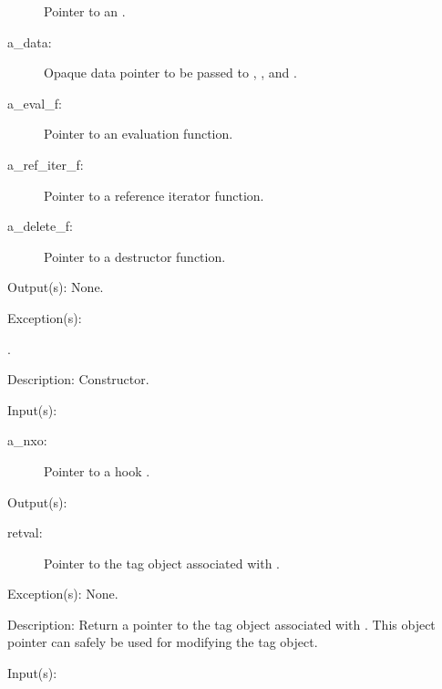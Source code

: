 \begin{capi}
\begin{capilist}
\begin{description}
			Pointer to an .
		\item[a\_data: ]
			Opaque data pointer to be passed to ,
			, and .
		\item[a\_eval\_f: ]
			Pointer to an evaluation function.
		\item[a\_ref\_iter\_f: ]
			Pointer to a reference iterator function.
		\item[a\_delete\_f: ]
			Pointer to a destructor function.
		\end{description}
	\item[Output(s): ] None.
	\item[Exception(s): ]
		\begin{description}\item[]
		\item[.]
		\end{description}
	\item[Description: ]
		Constructor.
	\end{capilist}
\label{nxo_hook_tag_get}
	\begin{capilist}
	\item[Input(s): ]
		\begin{description}\item[]
		\item[a\_nxo: ]
			Pointer to a hook .
		\end{description}
	\item[Output(s): ]
		\begin{description}\item[]
		\item[retval: ]
			Pointer to the tag object associated with .
		\end{description}
	\item[Exception(s): ] None.
	\item[Description: ]
		Return a pointer to the tag object associated with
		.  This object pointer can safely be used for
		modifying the tag object.
	\end{capilist}
\label{nxo_hook_data_get}
	\begin{capilist}
	\item[Input(s): ]
		\begin{description}\item[]

\end{description}
\end{capilist}
\end{capi}
